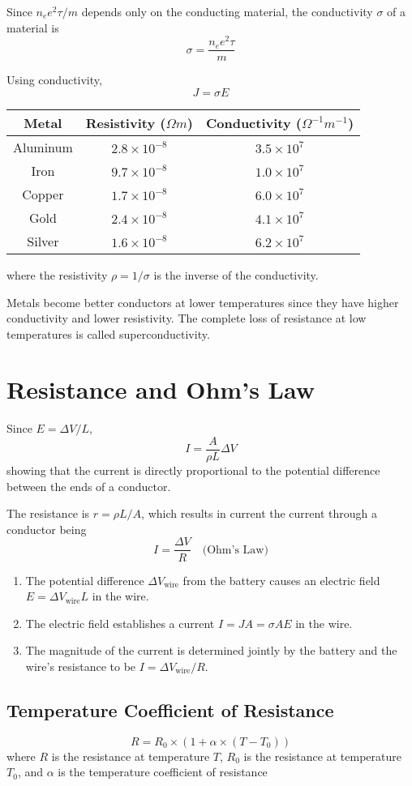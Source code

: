 \documentclass{article}
\begin{document}
Since $n_e e^2 \tau / m$ depends only on the conducting material, the conductivity $\sigma$ of a
material is
\[\sigma = \frac{n_e e^2 \tau}{m}\]

Using conductivity,\
\[J=\sigma E\]

\begin{center}
\begin{tabular}{|c c c|} 
    \hline
    Metal & Resistivity ($\Omega m$) & Conductivity ($\Omega^{-1} m^{-1}$) \\ [0.5ex]
    \hline
    Aluminum & $2.8\times 10^{-8}$ & $3.5\times 10^7$ \\
    \hline
    Iron & $9.7\times 10^{-8}$ & $1.0\times 10^7$ \\
    \hline
    Copper & $1.7 \times 10^{-8}$ & $6.0\times 10^7$ \\
    \hline
    Gold & $2.4\times 10^{-8}$ & $4.1\times 10^7$ \\
    \hline
    Silver & $1.6\times 10^{-8}$ & $6.2\times 10^7$ \\
    \hline
\end{tabular}
\end{center}
where the resistivity $\rho = 1/\sigma$ is the inverse of the conductivity.

\vspace{1em}

Metals become better conductors at lower temperatures since they have higher conductivity and lower
resistivity. The complete loss of resistance at low temperatures is called superconductivity.

\section*{Resistance and Ohm's Law}
Since $E=\Delta V / L$,
\[I=\frac{A}{\rho L}\Delta V\] showing that the current is directly proportional to the potential
difference between the ends of a conductor.

\vspace{1em}

The resistance is $r=\rho L / A$, which results in current the current through a conductor being
\[I=\frac{\Delta V}{R}\quad\text{(Ohm's Law)}\]

\begin{enumerate}
    \item The potential difference $\Delta V_\text{wire}$ from the battery causes an electric field
    $E=\Delta V_\text{wire} L$ in the wire.
    \item The electric field establishes a current $I=JA=\sigma AE$ in the wire.
    \item The magnitude of the current is determined jointly by the battery and the wire's
    resistance to be $I=\Delta V_\text{wire}/R$.
\end{enumerate}

\subsection*{Temperature Coefficient of Resistance}
\[R=R_0\times (1+\alpha \times (T-T_0))\]
where $R$ is the resistance at temperature $T$, $R_0$ is the resistance at temperature $T_0$, and
$\alpha$ is the temperature coefficient of resistance
\end{document}
